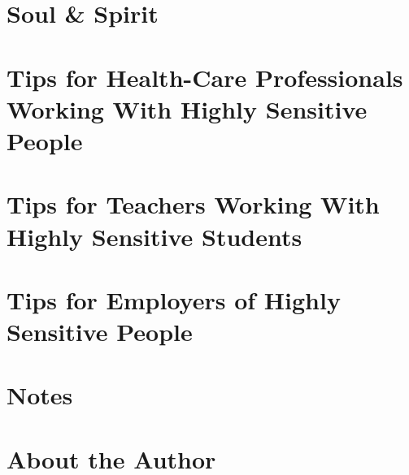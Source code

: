 \documentclass{article}
\numberwithin{equation}{section}
\begin{document}
\section{Soul \& Spirit}


\section{Tips for Health-Care Professionals Working With Highly Sensitive People}


\section{Tips for Teachers Working With Highly Sensitive Students}


\section{Tips for Employers of Highly Sensitive People}


\section{Notes}


\section{About the Author}


\printbibliography[heading=bibintoc]
	
\end{document}
